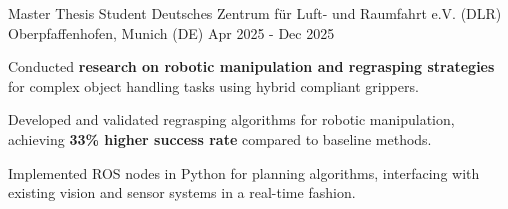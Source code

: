 
\cventry
{Master Thesis Student}
{Deutsches Zentrum für Luft- und Raumfahrt e.V. (DLR)}
{Oberpfaffenhofen, Munich (DE)}
{Apr 2025 - Dec 2025}
{
    \begin{cvitems}
        \item {Conducted \textbf{research on robotic manipulation and regrasping strategies} for complex object handling tasks using hybrid compliant grippers.}
        \item {Developed and validated regrasping algorithms for robotic manipulation, achieving \textbf{33\% higher success rate} compared to baseline methods.}
        \item {Implemented ROS nodes in Python for planning algorithms, interfacing with existing vision and sensor systems in a real-time fashion.}
    \end{cvitems}
}